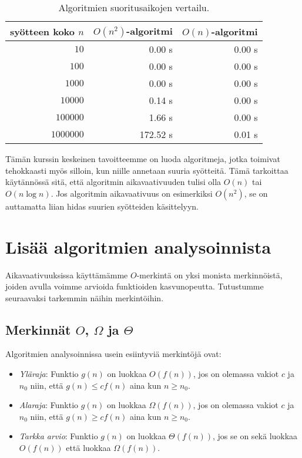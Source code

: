 \begin{table}
\center
\begin{tabular}{rrr}
syötteen koko $n$ & $O(n^2)$-algoritmi & $O(n)$-algoritmi \\
\hline
$10$ & 0.00 s & 0.00 s\\
$100$ & 0.00 s & 0.00 s\\
$1000$ & 0.00 s & 0.00 s\\
$10000$ & 0.14 s & 0.00 s \\
$100000$ & 1.66 s & 0.00 s \\
$1000000$ & 172.52 s & 0.01 s \\
\end{tabular}
\caption{Algoritmien suoritusaikojen vertailu.}
\label{tab:algver}
\end{table}

Tämän kurssin keskeinen tavoitteemme on luoda algoritmeja,
jotka toimivat tehokkaasti myös silloin, kun niille annetaan suuria syötteitä.
Tämä tarkoittaa käytännössä sitä, että algoritmin aikavaativuuden tulisi
olla $O(n)$ tai $O(n \log n)$.
Jos algoritmin aikavaativuus on esimerkiksi $O(n^2)$,
se on auttamatta liian hidas suurien syötteiden käsittelyyn.

\section{Lisää algoritmien analysoinnista}

Aikavaativuuksissa käyttämämme $O$-merkintä on yksi monista merkinnöistä,
joiden avulla voimme arvioida funktioiden kasvunopeutta.
Tutustumme seuraavaksi tarkemmin näihin merkintöihin.

\subsection{Merkinnät $O$, $\Omega$ ja $\Theta$}

Algoritmien analysoinnissa usein esiintyviä merkintöjä ovat:

\begin{itemize}
\item \emph{Yläraja}: Funktio $g(n)$ on luokkaa $O(f(n))$, jos on olemassa vakiot $c$ ja $n_0$
niin, että $g(n) \le c f(n)$ aina kun $n \ge n_0$.
\item \emph{Alaraja}: Funktio $g(n)$ on luokkaa $\Omega(f(n))$, jos on olemassa vakiot $c$ ja $n_0$
niin, että $g(n) \ge c f(n)$ aina kun $n \ge n_0$.
\item \emph{Tarkka arvio}: Funktio $g(n)$ on luokkaa $\Theta(f(n))$, jos se on sekä luokkaa $O(f(n))$
että luokkaa $\Omega(f(n))$.
\end{itemize}

